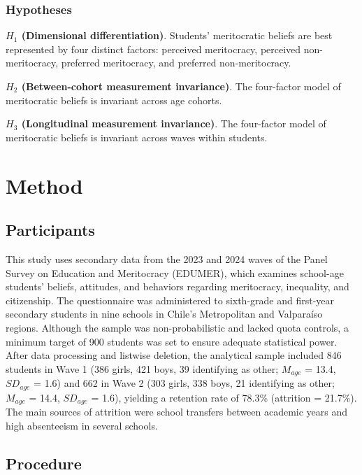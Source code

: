 \documentclass[
  13pt,
]{article}
\begin{document}
\subsubsection{Hypotheses}\label{hypotheses}

\textbf{\(H_1\) (Dimensional differentiation)}. Students' meritocratic
beliefs are best represented by four distinct factors: perceived
meritocracy, perceived non-meritocracy, preferred meritocracy, and
preferred non-meritocracy.

\textbf{\(H_2\) (Between-cohort measurement invariance)}. The
four-factor model of meritocratic beliefs is invariant across age
cohorts.

\textbf{\(H_3\) (Longitudinal measurement invariance)}. The four-factor
model of meritocratic beliefs is invariant across waves within students.

\section{Method}\label{method}

\subsection{Participants}\label{participants}

This study uses secondary data from the 2023 and 2024 waves of the Panel
Survey on Education and Meritocracy (EDUMER), which examines school-age
students' beliefs, attitudes, and behaviors regarding meritocracy,
inequality, and citizenship. The questionnaire was administered to
sixth-grade and first-year secondary students in nine schools in Chile's
Metropolitan and Valparaíso regions. Although the sample was
non-probabilistic and lacked quota controls, a minimum target of 900
students was set to ensure adequate statistical power. After data
processing and listwise deletion, the analytical sample included 846
students in Wave 1 (386 girls, 421 boys, 39 identifying as other;
\(M_{age}\) = 13.4, \(SD_{age}\) = 1.6) and 662 in Wave 2 (303 girls,
338 boys, 21 identifying as other; \(M_{age}\) = 14.4, \(SD_{age}\) =
1.6), yielding a retention rate of 78.3\% (attrition = 21.7\%). The main
sources of attrition were school transfers between academic years and
high absenteeism in several schools.

\subsection{Procedure}\label{procedure}
\end{document}
